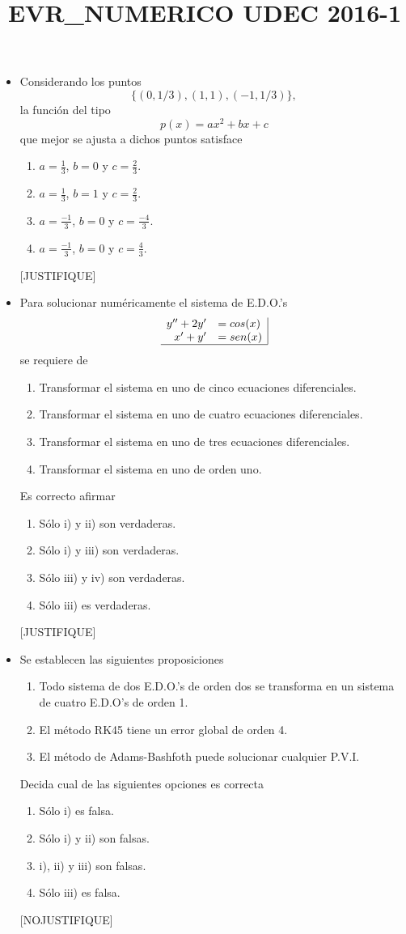 \documentclass[11pt]{article}
\newcommand{\buena}{[BUENA]}
\newcommand{\justifique}{[JUSTIFIQUE]}
\newcommand{\nojustifique}{[NOJUSTIFIQUE]}
\begin{document}
\title{EVR_NUMERICO UDEC 2016-1}
\begin{itemize}

\item Considerando los puntos 
$$
\{(0,1/3),(1,1),(-1,1/3)\},
$$
la funci\'on del tipo 
$$
p(x)=ax^2+bx+c
$$
que mejor se ajusta a dichos puntos satisface
\begin{enumerate} 
\item $a=\frac{1}{3}$, $b=0$ y $c=\frac{2}{3}$.
\item $a=\frac{1}{3}$, $b=1$ y $c=\frac{2}{3}$.
\item $a=\frac{-1}{3}$, $b=0$ y $c=\frac{-4}{3}$.
\item \buena $a=\frac{-1}{3}$, $b=0$ y $c=\frac{4}{3}$.
\end{enumerate}
\justifique 

\item Para solucionar num\'ericamente el sistema de E.D.O.'s
$$
\begin{array}{rl|}
y''+2y'	&=cos(x)\\
x'+y'	&=sen(x)\\\hline
\end{array}
$$
se requiere de 
\begin{enumerate}
	\item Transformar el sistema en uno de cinco ecuaciones diferenciales.
    \item Transformar el sistema en uno de cuatro ecuaciones diferenciales.
    \item Transformar el sistema en uno de tres ecuaciones diferenciales.
    \item Transformar el sistema en uno de orden uno.
\end{enumerate}
Es correcto afirmar
\begin{enumerate}
	\item Sólo i) y ii) son verdaderas.
    \item Sólo i) y iii) son verdaderas.
    \item \buena Sólo iii) y iv) son verdaderas.
    \item Sólo iii) es verdaderas.
\end{enumerate}
\justifique 

\item Se establecen las siguientes proposiciones
\begin{enumerate}
	\item Todo sistema de dos E.D.O.'s de orden dos se transforma en un sistema de cuatro E.D.O's de orden 1.
    \item El método RK45 tiene un error global de orden 4.
    \item El método de Adams-Bashfoth puede solucionar cualquier P.V.I.
\end{enumerate}
Decida cual de las siguientes opciones es correcta
\begin{enumerate}
	\item Sólo i) es falsa.
    \item Sólo i) y ii) son falsas.
    \item i), ii) y iii) son falsas.
    \item \buena Sólo iii) es falsa.
\end{enumerate}
\nojustifique 


\end{itemize}
\end{document}
